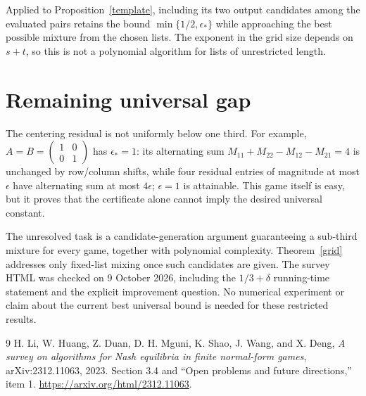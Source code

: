 \documentclass[11pt]{article}
\theoremstyle{definition}
\begin{document}
Applied to Proposition~\ref{template}, including its two output candidates
among the evaluated pairs retains the bound $\min\{1/2,\epsilon_*\}$
while approaching the best possible mixture from the chosen lists.
The exponent in the grid size depends on $s+t$, so this is not a polynomial
algorithm for lists of unrestricted length.

\section{Remaining universal gap}
The centering residual is not uniformly below one third. For example,
$A=B=\left(\begin{smallmatrix}1&0\\0&1\end{smallmatrix}\right)$ has
$\epsilon_*=1$: its alternating sum
$M_{11}+M_{22}-M_{12}-M_{21}=4$ is unchanged by row/column shifts, while
four residual entries of magnitude at most $\epsilon$ have alternating
sum at most $4\epsilon$; $\epsilon=1$ is attainable. This game itself
is easy, but it proves that the certificate alone cannot imply the
desired universal constant.

The unresolved task is a candidate-generation argument guaranteeing a
sub-third mixture for every game, together with polynomial complexity.
Theorem~\ref{grid} addresses only fixed-list mixing once such candidates
are given. The survey HTML was checked on 9 October 2026, including the
$1/3+\delta$ running-time statement and the explicit improvement question.
No numerical experiment or claim about the current best universal bound
is needed for these restricted results.
\begin{thebibliography}{9}
 H. Li, W. Huang, Z. Duan, D. H. Mguni, K. Shao,
J. Wang, and X. Deng, \emph{A survey on algorithms for Nash equilibria
in finite normal-form games}, arXiv:2312.11063, 2023.
Section 3.4 and ``Open problems and future directions,'' item 1.
\url{https://arxiv.org/html/2312.11063}.
\end{thebibliography}
\end{document}
